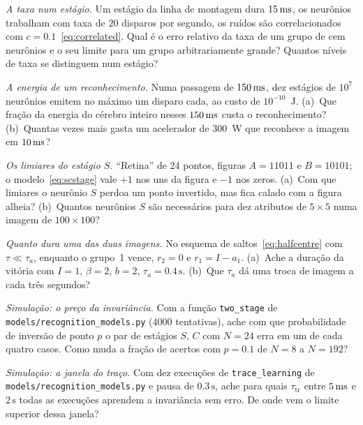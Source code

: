 \begin{exercise}[\lvlA]
\label{ex:12:1}
\emph{A taxa num estágio.} Um estágio da linha de montagem dura $15\,\text{ms}$, os neurônios trabalham com taxa de $20$ disparos por segundo, os ruídos são correlacionados com $c=0.1$~\eqref{eq:correlated}. Qual é o erro relativo da taxa de um grupo de cem neurônios e o seu limite para um grupo arbitrariamente grande? Quantos níveis de taxa se distinguem num estágio?
\end{exercise}

\begin{exercise}[\lvlA]
\label{ex:12:2}
\emph{A energia de um reconhecimento.} Numa passagem de $150\,\text{ms}$, dez estágios de $10^7$ neurônios emitem no máximo um disparo cada, ao custo de $10^{-10}$~J. (a)~Que fração da energia do cérebro inteiro nesses $150\,\text{ms}$ custa o reconhecimento? (b)~Quantas vezes mais gasta um acelerador de $300$~W que reconhece a imagem em $10\,\text{ms}$?
\end{exercise}

\begin{exercise}[\lvlB]
\label{ex:12:3}
\emph{Os limiares do estágio $S$.} ``Retina'' de $24$ pontos, figuras $A=11011$ e $B=10101$; o modelo~\eqref{eq:scstage} vale $+1$ nos uns da figura e $-1$ nos zeros. (a)~Com que limiares o neurônio $S$ perdoa um ponto invertido, mas fica calado com a figura alheia? (b)~Quantos neurônios $S$ são necessários para dez atributos de $5\times5$ numa imagem de $100\times100$?
\end{exercise}

\begin{exercise}[\lvlB]
\label{ex:12:4}
\emph{Quanto dura uma das duas imagens.} No esquema de saltos~\eqref{eq:halfcentre} com $\tau\ll\tau_a$, enquanto o grupo~1 vence, $r_2=0$ e $r_1=I-a_1$. (a)~Ache a duração da vitória com $I=1$, $\beta=2$, $b=2$, $\tau_a=0.4\,\text{s}$. (b)~Que $\tau_a$ dá uma troca de imagem a cada três segundos?
\end{exercise}

\begin{exercise}[\lvlB]
\label{ex:12:5}
\emph{Simulação: o preço da invariância.} Com a função \texttt{two\_stage} de \texttt{models/\allowbreak recognition\_models.py} ($4000$ tentativas), ache com que probabilidade de inversão de ponto $p$ o par de estágios $S$, $C$ com $N=24$ erra em um de cada quatro casos. Como muda a fração de acertos com $p=0.1$ de $N=8$ a $N=192$?
\end{exercise}

\begin{exercise}[\lvlB]
\label{ex:12:6}
\emph{Simulação: a janela do traço.} Com dez execuções de \texttt{trace\_learning} de \texttt{models/\allowbreak recognition\_models.py} e pausa de $0.3\,\text{s}$, ache para quais $\tau_{\text{tr}}$ entre $5\,\text{ms}$ e $2\,\text{s}$ todas as execuções aprendem a invariância sem erro. De onde vem o limite superior dessa janela?
\end{exercise}


